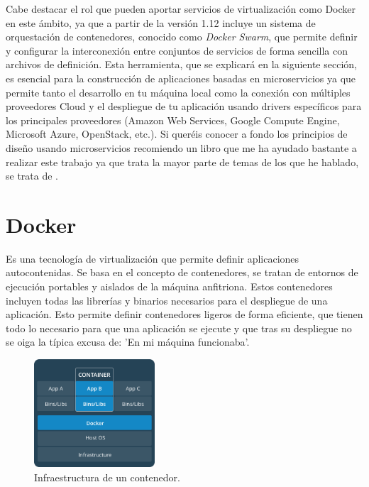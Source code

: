 Cabe destacar el rol que pueden aportar servicios de virtualización como Docker en este ámbito, ya que a partir de la versión 1.12 incluye un sistema de orquestación de contenedores, conocido como \emph{Docker Swarm}, que permite definir y configurar la interconexión entre conjuntos de servicios de forma sencilla con archivos de definición. Esta herramienta, que se explicará en la siguiente sección, es esencial para la construcción de aplicaciones basadas en microservicios ya que permite tanto el desarrollo en tu máquina local como la conexión con múltiples proveedores Cloud y el despliegue de tu aplicación usando drivers específicos para los principales proveedores (Amazon Web Services, Google Compute Engine, Microsoft Azure, OpenStack, etc.). Si queréis conocer a fondo los principios de diseño usando microservicios recomiendo un libro que me ha ayudado bastante a realizar este trabajo ya que trata la mayor parte de temas de los que he hablado, se trata de \cite{microbook}.


\vspace{1cm}
\section{Docker }\label{sec:docker}
Es una tecnología de virtualización que permite definir aplicaciones autocontenidas. Se basa en el concepto de contenedores, se tratan de entornos de ejecución portables y aislados de la máquina anfitriona. Estos contenedores incluyen todas las librerías y binarios necesarios para el despliegue de una aplicación. Esto permite definir contenedores ligeros de forma eficiente, que tienen todo lo necesario para que una aplicación se ejecute y que tras su despliegue no se oiga la típica excusa de: 'En mi máquina funcionaba'.

\begin{figure}
\centering
\includegraphics[width=0.4\textwidth]{container.png}
\caption{\label{fig:cont}Infraestructura de un contenedor.}
\end{figure}

